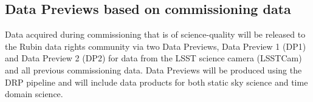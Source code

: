 \subsection{Data Previews based on commissioning data}

Data acquired during commissioning that is of science-quality will be released to the Rubin data rights community via two Data Previews, Data Preview 1 (DP1) and Data Preview 2 (DP2) for data from the LSST science camera (LSSTCam) and all previous commissioning data.
Data Previews will be produced using the DRP pipeline and will include data products for both static sky science and time domain science.
